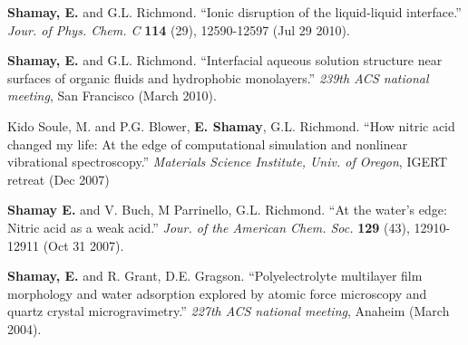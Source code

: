 \documentclass[margin,line]{res}
\begin{document}
\begin{resume}
\textbf{Shamay, E.} and G.L. Richmond. ``Ionic disruption of the liquid-liquid interface.'' \emph{Jour. of Phys. Chem. C} \textbf{114} (29), 12590-12597 (Jul 29 2010).

\textbf{Shamay, E.} and G.L. Richmond. ``Interfacial aqueous solution structure near surfaces of organic fluids and hydrophobic monolayers.'' \emph{239th ACS national meeting}, San Francisco (March 2010).

Kido Soule, M. and P.G. Blower, \textbf{E. Shamay}, G.L. Richmond. ``How nitric acid changed my life: At the edge of computational simulation and nonlinear vibrational spectroscopy.'' \emph{Materials Science Institute, Univ. of Oregon}, IGERT retreat (Dec 2007)

\textbf{Shamay E.} and V. Buch, M Parrinello, G.L. Richmond. ``At the water's edge: Nitric acid as a weak acid.'' \emph{Jour. of the American Chem. Soc.} \textbf{129} (43), 12910-12911 (Oct 31 2007).

\textbf{Shamay, E.} and R. Grant, D.E. Gragson. ``Polyelectrolyte multilayer film morphology and water adsorption explored by atomic force microscopy and quartz crystal microgravimetry.'' \emph{227th ACS national meeting}, Anaheim (March 2004).


%
%
%
%





\end{resume}
\end{document}

